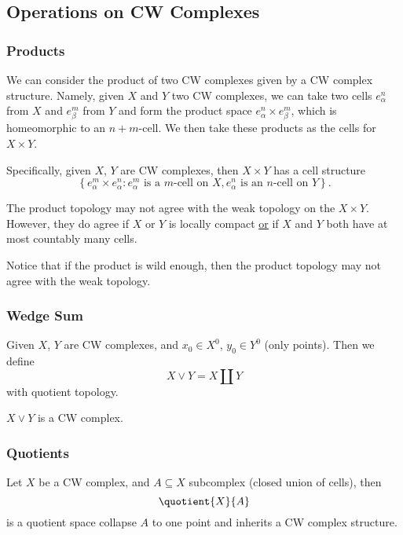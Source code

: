 \subsection{Operations on CW Complexes}
\subsubsection{Products}
We can consider the product of two CW complexes given by a CW complex structure. Namely, given \(X\) and \(Y\)
two CW complexes, we can take two cells \(e^n_{\alpha }\) from \(X\) and \(e^m_{\beta }\) from \(Y\) and
form the product space \(e^n_{\alpha }\times e^m_{\beta }\), which is homeomorphic to an \(n+m\)-cell. We then
take these products as the cells for \(X\times Y\).

Specifically, given \(X\), \(Y\) are CW complexes, then \(X\times Y\) has a cell structure
\[
	\left\{e_{\alpha}^m \times e_{\alpha}^n\colon e^m_{\alpha}\text{ is a \(m\)-cell on \(X\)}, e^n_{\alpha}\text{ is an \(n\)-cell on \(Y\)}\right\}.
\]
\begin{remark}
	The product topology may not agree with the weak topology on the \(X\times Y\). However, they do agree if
	\(X\) or \(Y\) is locally compact \underline{or} if \(X\) and \(Y\) both have at most countably many cells.
\end{remark}

\begin{note}
	Notice that if the product is wild enough, then the product topology may not agree with the weak topology.
\end{note}
\subsubsection{Wedge Sum}
Given \(X\), \(Y\) are CW complexes, and \(x_0\in X^0\), \(y_0\in Y^0\) (only points). Then we define
\[
	X\vee Y = X\coprod Y
\]
with quotient topology.
\begin{remark}
	\(X\lor Y\) is a CW complex.
\end{remark}

\subsubsection{Quotients}
Let \(X\) be a CW complex, and \(A\subseteq X\) subcomplex (closed union of cells), then
\[
	\quotient{X}{A}
\]
is a quotient space collapse \(A\) to one point and inherits a CW complex structure.

